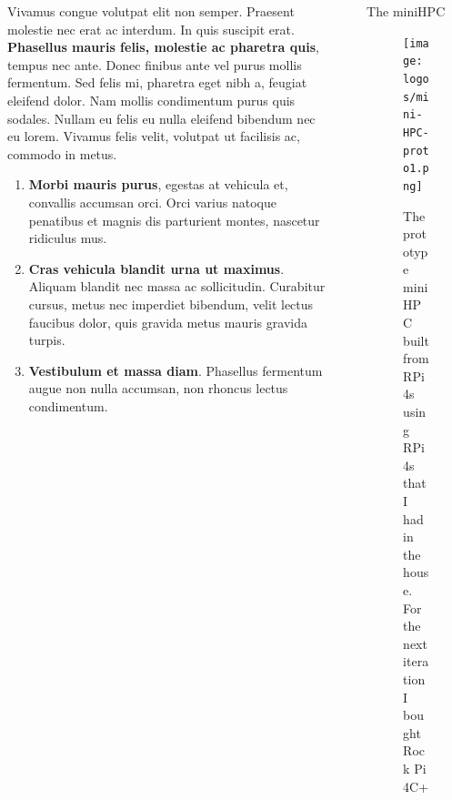 \documentclass[final]{beamer}
\newlength{\sepwidth}
\newlength{\colwidth}
\newcommand{\separatorcolumn}{\begin{column}{\sepwidth}\end{column}}
\begin{document}
\begin{frame}[t]
\begin{columns}[t]
\begin{column}{\colwidth}
\begin{block}
	
					Vivamus congue volutpat elit non semper. Praesent molestie nec erat ac
					interdum. In quis suscipit erat. \textbf{Phasellus mauris felis, molestie
						ac pharetra quis}, tempus nec ante. Donec finibus ante vel purus mollis
					fermentum. Sed felis mi, pharetra eget nibh a, feugiat eleifend dolor. Nam
					mollis condimentum purus quis sodales. Nullam eu felis eu nulla eleifend
					bibendum nec eu lorem. Vivamus felis velit, volutpat ut facilisis ac,
					commodo in metus.
					
					\begin{enumerate}
						\item \textbf{Morbi mauris purus}, egestas at vehicula et, convallis
						accumsan orci. Orci varius natoque penatibus et magnis dis parturient
						montes, nascetur ridiculus mus.
						\item \textbf{Cras vehicula blandit urna ut maximus}. Aliquam blandit nec
						massa ac sollicitudin. Curabitur cursus, metus nec imperdiet bibendum,
						velit lectus faucibus dolor, quis gravida metus mauris gravida turpis.
						\item \textbf{Vestibulum et massa diam}. Phasellus fermentum augue non
						nulla accumsan, non rhoncus lectus condimentum.
					\end{enumerate}
					
				\end{block}		
			\end{column}
			
			\separatorcolumn
			
			\begin{column}{\colwidth}
				
				\begin{block}{The miniHPC }

					\begin{figure}
						\begin{center}
							\texttt{[image: logos/mini-HPC-proto1.png]}
							\caption{The prototype miniHPC built from RPi4s using RPi 4s that I had in the house. For the next iteration I bought Rock Pi 4C+}
						\end{center}
					\end{figure}
				\end{block}

				
				

\end{column}
\end{columns}
\end{frame}
\end{document}
